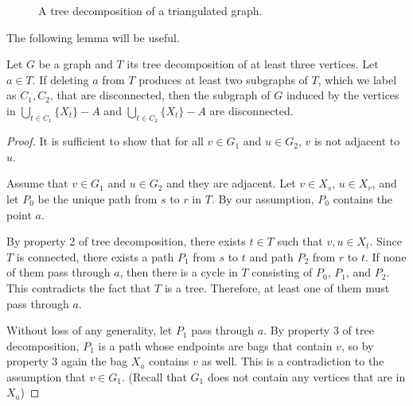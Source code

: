 \begin{figure}[ht]
	\centering
	
	\caption{A tree decomposition of a triangulated graph.}
	\label{fig:tree_decomposition_of_random_graph}
\end{figure}

The following lemma will be useful.

\begin{lemma}
	Let $G$ be a graph and $T$ its tree decomposition of at least three vertices. Let $a \in T$.
	If deleting $a$ from $T$ produces at least two subgraphs of $T$, which we label as $C_1, C_2$, that are disconnected, then the subgraph of $G$ induced by the vertices in $\bigcup_{t\in C_1} \{X_t\} - A $ and $\bigcup_{t\in C_2} \{X_t\} - A $ are disconnected.
\end{lemma} \label{lem:tree_decomposition_disconnected_subgraph}

\begin{proof}
	It is sufficient to show that for all $v\in G_1$ and $u \in G_2$, $v$ is not adjacent to $u$. 

	Assume that $v \in G_1$ and $u \in G_2$ and they are adjacent. 
	Let $v \in X_s$, $u \in X_r$, and let $P_0$ be the unique path from $s$ to $r$ in $T$. By our assumption, $P_0$ contains the point $a$.

	By property 2 of tree decomposition, there exists $t \in T$ such that $v, u \in X_t$.
	Since $T$ is connected, there exists a path $P_1$ from $s$ to $t$ and path $P_2$ from $r$ to $t$.
	If none of them pass through $a$, then there is a cycle in $T$ consisting of $P_0$, $P_1$, and $P_2$. This contradicts the fact that $T$ is a tree. Therefore, at least one of them must pass through $a$.

	Without loss of any generality, let $P_1$ pass through $a$.
	By property 3 of tree decomposition, $P_1$ is a path whose endpoints are bags that contain $v$, so by property 3 again the bag $X_a$ contains $v$ as well.
	This is a contradiction to the assumption that $v \in G_1$. (Recall that $G_1$ does not contain any vertices that are in $X_a$)
\end{proof}

